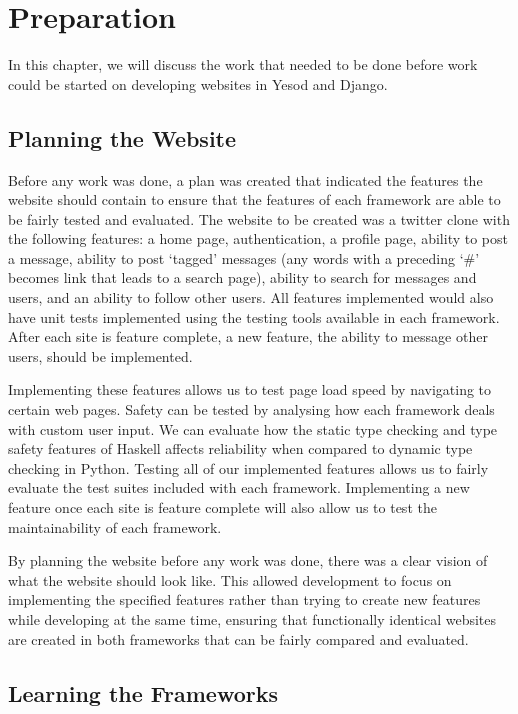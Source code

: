 \chapter{Preparation}
\label{chap:Preparation}

In this chapter, we will discuss the work that needed to be done before work could
be started on developing websites in Yesod and Django.

\section{Planning the Website}

Before any work was done, a plan was created that indicated the features the
website should contain to ensure that the features of each framework are able
to be fairly tested and evaluated. The website to be created was a twitter
clone with the following features: a home page, authentication, a profile page,
ability to post a message, ability to post `tagged' messages (any words with
a preceding `\#' becomes link that leads to a search page),
ability to search for messages and users, and an ability to follow other users.
All features implemented would also have unit tests implemented using the
testing tools available in each framework. After each site is feature complete,
a new feature, the ability to message other users, should be implemented.

Implementing these features allows us to test page load speed by navigating
to certain web pages. Safety can be tested by analysing how each framework deals with custom
user input. We can evaluate how the static type checking and type safety features of 
Haskell affects reliability when compared to dynamic type checking in Python. Testing
all of our implemented features allows us to fairly evaluate the
test suites included with each framework. Implementing a new feature once each
site is feature complete will also allow us to test the maintainability of
each framework.

By planning the website before any work was done, there was a clear vision of
what the website should look like. This allowed development to focus on implementing
the specified features rather than trying to create new features while developing
at the same time, ensuring that functionally identical websites are created in both
frameworks that can be fairly compared and evaluated.

\section{Learning the Frameworks}

